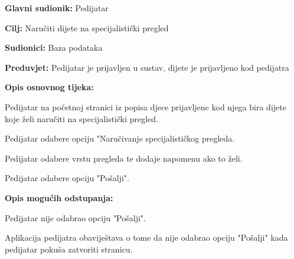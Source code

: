 					\noindent {}
					\begin{packed_item}
						
						\item \textbf{Glavni sudionik: }Pedijatar
						\item  \textbf{Cilj:} Naručiti dijete na specijalistički pregled
						\item  \textbf{Sudionici:} Baza podataka
						\item  \textbf{Preduvjet:} Pedijatar je prijavljen u sustav, dijete je prijavljeno kod pedijatra
						\item  \textbf{Opis osnovnog tijeka:}
						
						\item[] \begin{packed_enum}
							
							\item Pedijatar na početnoj stranici iz popisa djece prijavljene kod njega bira dijete koje želi naručiti na specijalistički pregled.
							\item Pedijatar odabere opciju "Naručivanje specijalističkog pregleda.
							\item Pedijatar odabere vrstu pregleda te dodaje napomenu ako to želi.
							\item Pedijatar odabere opciju "Pošalji".
						\end{packed_enum}
						
						\item  \textbf{Opis mogućih odstupanja:}
						
						\item[] \begin{packed_item}
							
							\item[4.a] Pedijatar nije odabrao opciju "Pošalji".
							\item[] \begin{packed_enum}
								
								\item Aplikacija pedijatra obaviještava o tome da nije odabrao opciju "Pošalji" kada pedijatar pokuša zatvoriti stranicu.
							\end{packed_enum}
							
							
						\end{packed_item}
						
						
					\end{packed_item}
					
